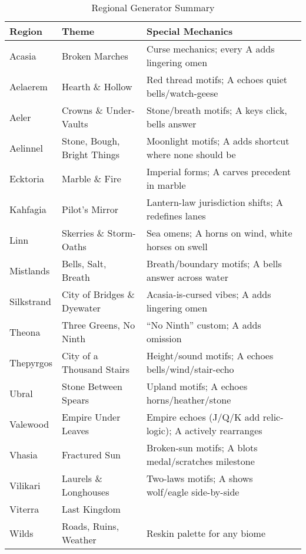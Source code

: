 \begin{table}[htbp]
\centering
\begin{tabular}{lll}
\toprule
\textbf{Region} & \textbf{Theme} & \textbf{Special Mechanics} \\
\midrule
Acasia & Broken Marches & Curse mechanics; every A adds lingering omen \\
Aelaerem & Hearth \& Hollow & Red thread motifs; A echoes quiet bells/watch-geese \\
Aeler & Crowns \& Under-Vaults & Stone/breath motifs; A keys click, bells answer \\
Aelinnel & Stone, Bough, Bright Things & Moonlight motifs; A adds shortcut where none should be \\
Ecktoria & Marble \& Fire & Imperial forms; A carves precedent in marble \\
Kahfagia & Pilot's Mirror & Lantern-law jurisdiction shifts; A redefines lanes \\
Linn & Skerries \& Storm-Oaths & Sea omens; A horns on wind, white horses on swell \\
Mistlands & Bells, Salt, Breath & Breath/boundary motifs; A bells answer across water \\
Silkstrand & City of Bridges \& Dyewater & Acasia-is-cursed vibes; A adds lingering omen \\
Theona & Three Greens, No Ninth & ``No Ninth'' custom; A adds omission \\
Thepyrgos & City of a Thousand Stairs & Height/sound motifs; A echoes bells/wind/stair-echo \\
Ubral & Stone Between Spears & Upland motifs; A echoes horns/heather/stone \\
Valewood & Empire Under Leaves & Empire echoes (J/Q/K add relic-logic); A actively rearranges \\
Vhasia & Fractured Sun & Broken-sun motifs; A blots medal/scratches milestone \\
Vilikari & Laurels \& Longhouses & Two-laws motifs; A shows wolf/eagle side-by-side \\
Viterra & Last Kingdom & & \\
Wilds & Roads, Ruins, Weather & Reskin palette for any biome \\
\bottomrule
\end{tabular}
\caption{Regional Generator Summary}
\end{table}





















